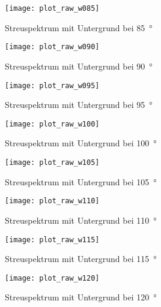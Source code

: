 \documentclass[11pt, ngerman, fleqn, DIV=15, headinclude, BCOR=2cm]{scrreprt}
\begin{document}
\begin{appendix}
\begin{figure}[h]
    \centering
    \texttt{[image: plot\_raw\_w085]}
    \caption{%
	    Streuspektrum mit Untergrund bei \SI{85}{\degree}
    }
    \label{fig:plot_raw_w085}
\end{figure}

\begin{figure}[h]
    \centering
    \texttt{[image: plot\_raw\_w090]}
    \caption{%
	    Streuspektrum mit Untergrund bei \SI{90}{\degree}
    }
    \label{fig:plot_raw_w090}
\end{figure}

\begin{figure}[h]
    \centering
    \texttt{[image: plot\_raw\_w095]}
    \caption{%
	    Streuspektrum mit Untergrund bei \SI{95}{\degree}
    }
    \label{fig:plot_raw_w095}
\end{figure}

\begin{figure}[h]
    \centering
    \texttt{[image: plot\_raw\_w100]}
    \caption{%
	    Streuspektrum mit Untergrund bei \SI{100}{\degree}
    }
    \label{fig:plot_raw_w100}
\end{figure}

\begin{figure}[h]
    \centering
    \texttt{[image: plot\_raw\_w105]}
    \caption{%
	    Streuspektrum mit Untergrund bei \SI{105}{\degree}
    }
    \label{fig:plot_raw_w105}
\end{figure}

\begin{figure}[h]
    \centering
    \texttt{[image: plot\_raw\_w110]}
    \caption{%
	    Streuspektrum mit Untergrund bei \SI{110}{\degree}
    }
    \label{fig:plot_raw_w110}
\end{figure}

\begin{figure}[h]
    \centering
    \texttt{[image: plot\_raw\_w115]}
    \caption{%
	    Streuspektrum mit Untergrund bei \SI{115}{\degree}
    }
    \label{fig:plot_raw_w115}
\end{figure}

\begin{figure}[h]
    \centering
    \texttt{[image: plot\_raw\_w120]}
    \caption{%
	    Streuspektrum mit Untergrund bei \SI{120}{\degree}
    }
    \label{fig:plot_raw_w120}
\end{figure}


\end{appendix}
\end{document}

